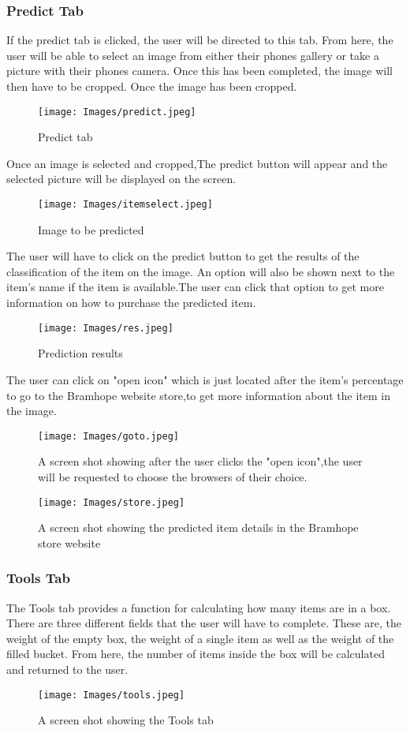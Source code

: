\documentclass[a4paper, 12pt]{article}
\begin{document}
\subsubsection{Predict Tab}

If the predict tab is clicked, the user will be directed to this tab. From here, the user will be able to select an image from either their phones gallery or take a picture with their phones camera. Once this has been completed, the image will then have to be cropped. Once the image has been cropped.
\begin{figure}[!h]
\texttt{[image: Images/predict.jpeg]}
\centering
\caption{Predict tab} 
\end{figure}
\pagebreak
\newpage
Once an image is selected and cropped,The predict button will appear and the selected picture will be displayed on the screen.
\begin{figure}[H]
\texttt{[image: Images/itemselect.jpeg]}
\centering
\caption{Image to be predicted} 
\end{figure}
The user will have to click on the predict button to get the results of the classification of the item on the image. An option will also be shown next to the item's name if the item is available.The user can click that option to get more information on how to purchase the predicted item.

\begin{figure}[H]
\texttt{[image: Images/res.jpeg]}
\centering
\caption{Prediction results}
\end{figure}
The user can click on "open icon" which is just located after the item's percentage to go to the Bramhope website store,to get more information about the item in the image.

\begin{figure}[H]
\texttt{[image: Images/goto.jpeg]}
\centering
\caption{A screen shot showing after the user clicks the "open icon",the user will be requested to choose the browsers of their choice.}
\end{figure}

\begin{figure}[H]
\texttt{[image: Images/store.jpeg]}
\centering
\caption{A screen shot showing the predicted item details in the Bramhope store website}
\end{figure}
\newpage
\subsubsection{Tools Tab}
The Tools tab provides a function for calculating how many items are in a box.\\
There are three different fields that the user will have to complete. These are, the weight of the empty box, the weight of a single item as well as the weight of the filled bucket. From here, the number of items inside the box will be calculated and returned to the user.
\begin{figure}[H]
\texttt{[image: Images/tools.jpeg]}
\centering
\caption{A screen shot showing the Tools tab} 
\end{figure}
\end{document}
